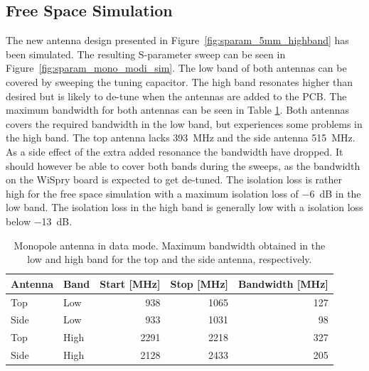 \FloatBarrier
\subsection{Free Space Simulation}
\label{sec:highbandsimulations}
The new antenna design presented in Figure~\ref{fig:sparam_5mm_highband} has been simulated. The resulting S-parameter sweep can be seen in Figure~\ref{fig:sparam_mono_modi_sim}. The low band of both antennas can be covered by sweeping the tuning capacitor. The high band resonates higher than desired but is likely to de-tune when the antennas are added to the PCB. The maximum bandwidth for both antennas can be seen in Table \ref{tab:bw_mono_modi_fs}. Both antennas covers the required bandwidth in the low band, but experiences some problems in the high band. The top antenna lacks \SI{393}{MHz} and the side antenna \SI{515}{MHz}. As a side effect of the extra added resonance the bandwidth have dropped. It should however be able to cover both bands during the sweeps, as the bandwidth on the WiSpry board is expected to get de-tuned.
The isolation loss is rather high for the free space simulation with a maximum isolation loss of \SI{-6}{dB} in the low band. The isolation loss in the high band is generally low with a isolation loss below \SI{-13}{dB}.

\begin{table}[htbp]
  \centering
  \begin{tabular}{|l|l|r|r|r|}
    \hline
    Antenna & Band & Start [MHz] & Stop [MHz] & Bandwidth [MHz] \\
    \hline
    Top     & Low  &  938  & 1065  & 127 \\
    Side    & Low  &  933  & 1031  & 98  \\
    \hline
    Top     & High &  2291 &  2218  & 327 \\
    Side    & High & 2128 &  2433 & 205 \\
    \hline
  \end{tabular}
  \caption{Monopole antenna in data mode. Maximum bandwidth obtained in the low and high band for the top and the side antenna, respectively.}    
  \label{tab:bw_mono_modi_fs}
\end{table}


